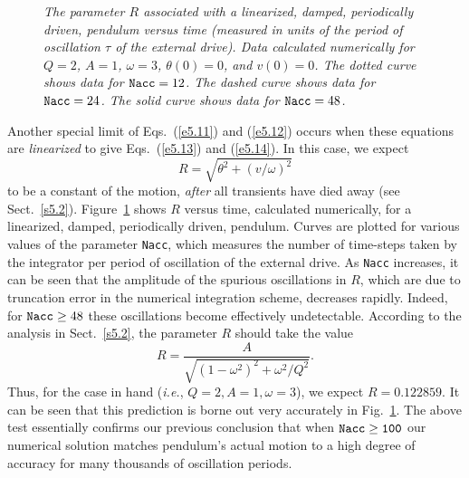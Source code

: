 \begin{figure}
\epsfysize=3in
\centerline{}
\caption{\em The parameter $R$ associated with a linearized, damped, periodically
driven, pendulum versus  time (measured in units of the period
of oscillation $\tau$ of the external drive). Data calculated numerically
for $Q=2$, $A=1$, $\omega=3$, $\theta(0)=0$, and $v(0)=0$. The
dotted curve shows data for ${\tt Nacc}=12$. The dashed curve
shows data for ${\tt Nacc} = 24$. The solid curve
shows data for ${\tt Nacc} = 48$.
}\label{f17}
\end{figure}

Another special limit of Eqs.~(\ref{e5.11}) and (\ref{e5.12}) occurs when these equations
are {\em linearized} to give Eqs.~(\ref{e5.13}) and (\ref{e5.14}). In this
case, we expect
\begin{equation}
R = \sqrt{\theta^2 + (v/\omega)^2}
\end{equation}
to be a constant of the motion, {\em after} all transients have died away (see Sect.~\ref{s5.2}).
Figure~\ref{f17} shows $R$ versus time, calculated numerically, for
a linearized, damped, periodically driven, pendulum. Curves are plotted
for various values of the parameter {\tt Nacc}, which  measures the number
of time-steps taken by the integrator per period of oscillation of the external drive.
As {\tt Nacc} increases, it can be seen that the amplitude of the spurious oscillations in $R$,
which are due to truncation error in the numerical integration scheme, decreases rapidly.
Indeed, for ${\tt Nacc}\geq  48$ these oscillations become effectively undetectable. According to
the analysis in Sect.~\ref{s5.2}, the parameter $R$ should take the value
\begin{equation}
R = \frac{A}{\sqrt{(1-\omega^2)^2+\omega^2/Q^2}}.
\end{equation}
Thus, for the case in hand ({\em i.e.}, $Q=2, A=1, \omega=3$), we expect $R= 0.122859$. It can be seen that
this prediction is borne out very accurately in Fig.~\ref{f17}. The above test essentially
confirms our previous conclusion that when ${\tt Nacc\geq 100}$ our numerical solution
matches pendulum's actual motion to a high degree of
accuracy for many thousands of oscillation periods.

